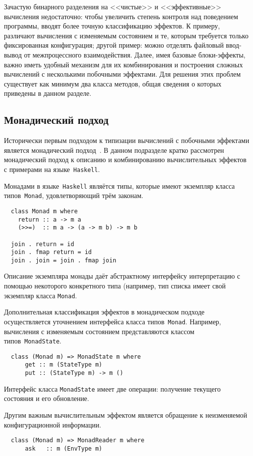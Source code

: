 \documentclass [a4paper] {article}
\begin{document}
Зачастую бинарного разделения на <<чистые>> и <<эффективные>>
вычисления недостаточно: чтобы увеличить степень контроля над поведением программы,
вводят более точную классификацию эффектов. К примеру, различают вычисления с изменяемым
состоянием и те, которым требуется только фиксированная конфигурация;
другой пример: можно отделять файловый ввод-вывод от межпроцессного взаимодействия. Далее, имея
базовые блоки-эффекты, важно иметь удобный механизм для их комбинирования и
построения сложных вычислений с несколькими побочными эффектами. Для решения
этих проблем существует как минимум два класса методов, общая сведения о которых приведены в данном разделе.

\subsection{Монадический подход}

Исторически первым подходом к типизации вычислений с побочными эффектами
является монадический подход~\cite{Moggi:1989:CLM:77350.77353}. В данном подразделе
кратко рассмотрен монадический подход к описанию и комбинированию
вычислительных эффектов с примерами на языке~\texttt{Haskell}.

Монадами в языке~\texttt{Haskell} являётся типы, которые имеют экземпляр
класса типов~\texttt{Monad}, удовлетворяющий трём законам.
\begin{verbatim}
  class Monad m where
    return :: a -> m a
    (>>=)  :: m a -> (a -> m b) -> m b

  join . return = id
  join . fmap return = id
  join . join = join . fmap join
\end{verbatim}
Описание экземпляра монады даёт абстрактному интерфейсу
интерпретацию с помощью некоторого конкретного типа (например, тип списка имеет свой экземпляр класса \texttt{Monad}.

Дополнительная классификация эффектов в монадическом подходе осуществляется
уточнением интерфейса класса типов~\texttt{Monad}. Например, вычисления с
изменяемым состоянием представляются классом типов~\texttt{MonadState}.
\begin{verbatim}
  class (Monad m) => MonadState m where
      get :: m (StateType m)
      put :: (StateType m) -> m ()
\end{verbatim}
Интерфейс класса \texttt{MonadState} имеет две операции: получение текущего состояния и его обновление.

Другим важным вычислительным эффектом является обращение к
неизменяемой конфигурационной информации.
\begin{verbatim}
  class (Monad m) => MonadReader m where
      ask   :: m (EnvType m)
\end{verbatim}
\end{document}
